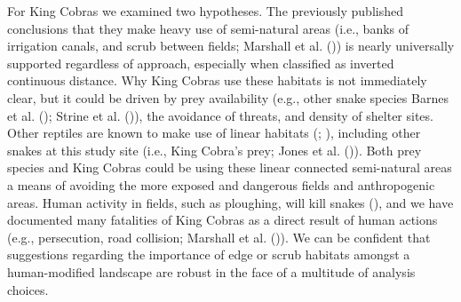 \documentclass[10pt,a4paper]{article}
\begin{document}
For King Cobras we examined two hypotheses.
The previously published conclusions that they make heavy use of semi-natural areas (i.e., banks of irrigation canals, and scrub between fields; Marshall et al. ()) is nearly universally supported regardless of approach, especially when classified as inverted continuous distance.
Why King Cobras use these habitats is not immediately clear, but it could be driven by prey availability (e.g., other snake species Barnes et al. (); Strine et al. ()), the avoidance of threats, and density of shelter sites.
Other reptiles are known to make use of linear habitats (; ), including other snakes at this study site (i.e., King Cobra's prey; Jones et al. ()).
Both prey species and King Cobras could be using these linear connected semi-natural areas a means of avoiding the more exposed and dangerous fields and anthropogenic areas.
Human activity in fields, such as ploughing, will kill snakes (), and we have documented many fatalities of King Cobras as a direct result of human actions (e.g., persecution, road collision; Marshall et al. ()).
We can be confident that suggestions regarding the importance of edge or scrub habitats amongst a human-modified landscape are robust in the face of a multitude of analysis choices.
\end{document}
